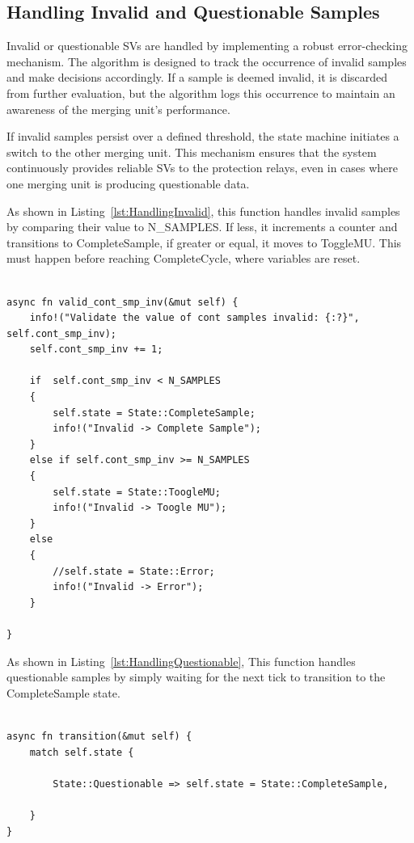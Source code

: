 \pagebreak

\subsection{Handling Invalid and Questionable Samples}
Invalid or questionable SVs are handled by implementing a robust error-checking mechanism. The algorithm is designed to track the occurrence of invalid samples and make decisions accordingly. If a sample is deemed invalid, it is discarded from further evaluation, but the algorithm logs this occurrence to maintain an awareness of the merging unit's performance.

If invalid samples persist over a defined threshold, the state machine initiates a switch to the other merging unit. This mechanism ensures that the system continuously provides reliable SVs to the protection relays, even in cases where one merging unit is producing questionable data.

As shown in Listing~\ref{lst:HandlingInvalid}, this function handles invalid samples by comparing their value to N\_SAMPLES. If less, it increments a counter and transitions to CompleteSample, if greater or equal, it moves to ToggleMU. This must happen before reaching CompleteCycle, where variables are reset.

\begin{lstlisting}[breaklines=true, caption={Asynchronous function valid cont smp inv() that processes a .}, label={lst:HandlingInvalid}]
	
async fn valid_cont_smp_inv(&mut self) {
	info!("Validate the value of cont samples invalid: {:?}", self.cont_smp_inv);
	self.cont_smp_inv += 1;
	
	if  self.cont_smp_inv < N_SAMPLES
	{
		self.state = State::CompleteSample;
		info!("Invalid -> Complete Sample");
	}
	else if self.cont_smp_inv >= N_SAMPLES 
	{
		self.state = State::ToogleMU;
		info!("Invalid -> Toogle MU");
	}
	else 
	{
		//self.state = State::Error;
		info!("Invalid -> Error");    
	}      
	
}
\end{lstlisting}

As shown in Listing~\ref{lst:HandlingQuestionable}, This function handles questionable samples by simply waiting for the next tick to transition to the CompleteSample state.

\begin{lstlisting}[breaklines=true, caption={It's wait the transition tick.}, label={lst:HandlingQuestionable}]

async fn transition(&mut self) {
	match self.state {
		
		State::Questionable => self.state = State::CompleteSample,

	}
}
\end{lstlisting}

